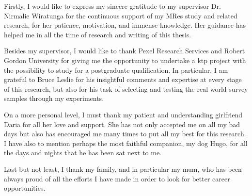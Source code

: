 	Firstly, I would like to express my sincere gratitude to my supervisor Dr. Nirmalie Wiratunga for the continuous support of my MRes study and related research, for her patience, motivation, and immense knowledge. Her guidance has helped me in all the time of research and writing of this thesis.

	Besides my supervisor, I would like to thank Pexel Research Services and Robert Gordon University for giving me the opportunity to undertake a \gls{ktp} project with the possibility to study for a postgraduate qualification. In particular, I am grateful to Bruce Leslie for his insightful comments and expertise at every stage of this research, but also for his task of selecting and testing the real-world survey samples through my experiments.

	On a more personal level, I must thank my patient and understanding girlfriend Daria for all her love and support. She has not only accepted me on all my bad days but also has encouraged me many times to put all my best for this research. I have also to mention perhaps the most faithful companion, my dog Hugo, for all the days and nights that he has been sat next to me.

	Last but not least, I thank my family, and in particular my mum, who has been always proud of all the efforts I have made in order to look for better career opportunities.
